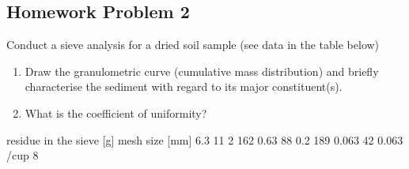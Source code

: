\documentclass[letterpaper,10pt,english]{sphinxmanual}
\begin{document}
\subsection{Homework Problem 2}
\label{\detokenize{contents/tutorials/tutorial_04/tutorial_04:homework-problem-2}}
Conduct a sieve analysis for a dried soil sample (see data in the table below)
\begin{enumerate}
%
\item {} 
Draw the granulometric curve (cumulative mass distribution) and briefly characterise the sediment with regard to its major constituent(s).

\item {} 
What is the coefficient of uniformity?

\end{enumerate}

\begin{sphinxVerbatim}[commandchars=\\\{\}]
  \PYG{p}{[}   \PYG{p}{]}
  \PYG{p}{[}     \PYG{p}{]}
  \PYG{p}{[}     \PYG{p}{]}


    
 
\end{sphinxVerbatim}

\begin{sphinxVerbatim}[commandchars=\\\{\}]
                residue in the sieve [g] 
mesh size [mm]                           
6.3                                    11
2                                     162
0.63                                   88
0.2                                   189
0.063                                  42
\PYGZlt{} 0.063 /cup                            8
\end{sphinxVerbatim}
\end{document}
